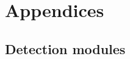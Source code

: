 \documentclass[11pt,fleqn,oneside]{book} %
\begin{document}
\part{Appendices}
\chapter{Detection modules} \label{ch:detection-modules}

\end{document}
